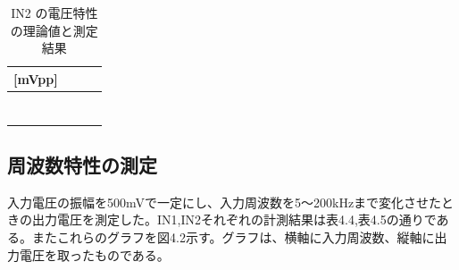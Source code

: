 \documentclass{jlreq}
\numberwithin{equation}{section}
\begin{document}
\begin{table}[H]
  \centering
  \caption{IN2 の電圧特性の理論値と測定結果}
  \begin{tabular}{|c|c|c|c|}
    \hline
      \color{blue}{入力電圧(理論値)} [mVpp] & \color{blue}{出力電圧(理論値) [mVpp]} & \color{blue}{入力電圧(実測値) [mVpp]} & \color{blue}{出力電圧(実測値) [mVpp]} \\ \hline
      \color{blue}{400} & \color{blue}{3000} & \color{blue}{404} & \color{blue}{2860} \\ \hline
      \color{blue}{500} & \color{blue}{3750} & \color{blue}{504} & \color{blue}{3640} \\ \hline
      \color{blue}{600} & \color{blue}{4500} & \color{blue}{604} & \color{blue}{4380} \\ \hline
      \color{blue}{700} & \color{blue}{5250} & \color{blue}{704} & \color{blue}{5080} \\ \hline
      \color{blue}{800} & \color{blue}{6000} & \color{blue}{800} & \color{blue}{5920} \\ \hline
      \color{blue}{900} & \color{blue}{6750} & \color{blue}{900} & \color{blue}{6640} \\ \hline
      \color{blue}{1000} & \color{blue}{7500} & \color{blue}{1020} & \color{blue}{7460} \\ \hline
  \end{tabular}
\end{table}

\subsection{周波数特性の測定}
入力電圧の振幅を500mVで一定にし、入力周波数を5〜200kHzまで変化させたときの出力電圧を測定した。IN1,IN2それぞれの計測結果は表4.4,表4.5の通りである。またこれらのグラフを図4.2示す。グラフは、横軸に入力周波数、縦軸に出力電圧を取ったものである。
\end{document}
